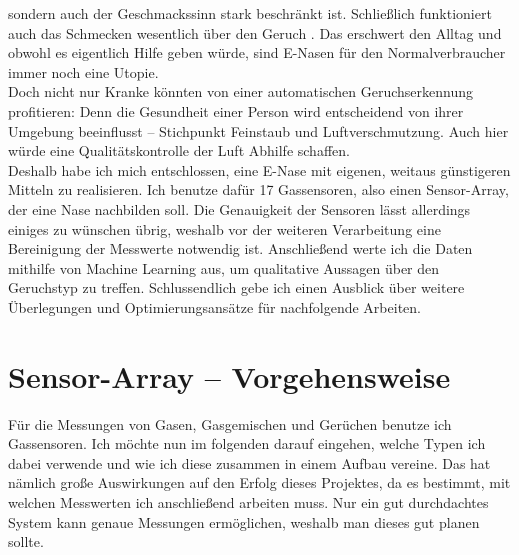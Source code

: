 \documentclass[10pt]{article}
\begin{document}
sondern auch der Geschmackssinn stark beschränkt ist. Schließlich funktioniert auch das Schmecken wesentlich über den Geruch \autocite{SchmeckenMitDerNase}. Das erschwert den 
Alltag und obwohl es eigentlich Hilfe geben würde, sind E-Nasen für den Normalverbraucher immer noch eine Utopie.\\
Doch nicht nur Kranke könnten von einer automatischen Geruchserkennung profitieren: Denn die Gesundheit einer Person wird entscheidend von ihrer Umgebung beeinflusst – Stichpunkt Feinstaub und Luftverschmutzung. Auch hier würde eine Qualitätskontrolle der Luft Abhilfe schaffen.\\
Deshalb habe ich mich entschlossen, eine E-Nase mit eigenen, weitaus günstigeren Mitteln zu realisieren.
Ich benutze dafür 17 Gassensoren, also einen Sensor-Array, der eine Nase nachbilden soll. Die Genauigkeit der Sensoren lässt allerdings einiges zu wünschen übrig,
weshalb vor der weiteren Verarbeitung eine Bereinigung der Messwerte notwendig ist. Anschließend werte ich die Daten mithilfe von Machine Learning aus,
um qualitative Aussagen über den Geruchstyp zu treffen.
Schlussendlich gebe ich einen Ausblick über weitere Überlegungen und Optimierungsansätze für nachfolgende Arbeiten.


\section{Sensor-Array – Vorgehensweise}
Für die Messungen von Gasen, Gasgemischen und Gerüchen benutze ich Gassensoren. Ich möchte nun im folgenden darauf eingehen, welche Typen ich dabei verwende und wie ich diese
zusammen in einem Aufbau vereine. Das hat nämlich große Auswirkungen auf den Erfolg dieses Projektes, da es bestimmt, mit welchen Messwerten ich anschließend arbeiten muss.
Nur ein gut durchdachtes System kann genaue Messungen ermöglichen, weshalb man dieses gut planen sollte.
\end{document}
